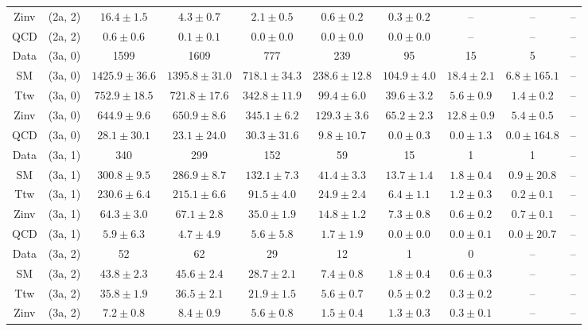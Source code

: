 \begin{table}[h!]
{\begin{tabular}{cccccccccc}
	Zinv & (2a, 2) & $16.4\pm 1.5$ & $4.3\pm 0.7$ & $2.1\pm 0.5$ & $0.6\pm 0.2$ & $0.3\pm 0.2$ & -- & -- & -- \\[0.5ex] 
	QCD & (2a, 2) & $0.6\pm 0.6$ & $0.1\pm 0.1$ & $0.0\pm 0.0$ & $0.0\pm 0.0$ & $0.0\pm 0.0$ & -- & -- & -- \\[0.5ex] 
	Data & (3a, 0) & 1599 & 1609 & 777 & 239 & 95 & 15 & 5 & -- \\[0.5ex] 
	SM & (3a, 0) & $1425.9\pm 36.6$ & $1395.8\pm 31.0$ & $718.1\pm 34.3$ & $238.6\pm 12.8$ & $104.9\pm 4.0$ & $18.4\pm 2.1$ & $6.8\pm 165.1$ & -- \\[0.5ex] 
	Ttw & (3a, 0) & $752.9\pm 18.5$ & $721.8\pm 17.6$ & $342.8\pm 11.9$ & $99.4\pm 6.0$ & $39.6\pm 3.2$ & $5.6\pm 0.9$ & $1.4\pm 0.2$ & -- \\[0.5ex] 
	Zinv & (3a, 0) & $644.9\pm 9.6$ & $650.9\pm 8.6$ & $345.1\pm 6.2$ & $129.3\pm 3.6$ & $65.2\pm 2.3$ & $12.8\pm 0.9$ & $5.4\pm 0.5$ & -- \\[0.5ex] 
	QCD & (3a, 0) & $28.1\pm 30.1$ & $23.1\pm 24.0$ & $30.3\pm 31.6$ & $9.8\pm 10.7$ & $0.0\pm 0.3$ & $0.0\pm 1.3$ & $0.0\pm 164.8$ & -- \\[0.5ex] 
	Data & (3a, 1) & 340 & 299 & 152 & 59 & 15 & 1 & 1 & -- \\[0.5ex] 
	SM & (3a, 1) & $300.8\pm 9.5$ & $286.9\pm 8.7$ & $132.1\pm 7.3$ & $41.4\pm 3.3$ & $13.7\pm 1.4$ & $1.8\pm 0.4$ & $0.9\pm 20.8$ & -- \\[0.5ex] 
	Ttw & (3a, 1) & $230.6\pm 6.4$ & $215.1\pm 6.6$ & $91.5\pm 4.0$ & $24.9\pm 2.4$ & $6.4\pm 1.1$ & $1.2\pm 0.3$ & $0.2\pm 0.1$ & -- \\[0.5ex] 
	Zinv & (3a, 1) & $64.3\pm 3.0$ & $67.1\pm 2.8$ & $35.0\pm 1.9$ & $14.8\pm 1.2$ & $7.3\pm 0.8$ & $0.6\pm 0.2$ & $0.7\pm 0.1$ & -- \\[0.5ex] 
	QCD & (3a, 1) & $5.9\pm 6.3$ & $4.7\pm 4.9$ & $5.6\pm 5.8$ & $1.7\pm 1.9$ & $0.0\pm 0.0$ & $0.0\pm 0.1$ & $0.0\pm 20.7$ & -- \\[0.5ex] 
	Data & (3a, 2) & 52 & 62 & 29 & 12 & 1 & 0 & -- & -- \\[0.5ex] 
	SM & (3a, 2) & $43.8\pm 2.3$ & $45.6\pm 2.4$ & $28.7\pm 2.1$ & $7.4\pm 0.8$ & $1.8\pm 0.4$ & $0.6\pm 0.3$ & -- & -- \\[0.5ex] 
	Ttw & (3a, 2) & $35.8\pm 1.9$ & $36.5\pm 2.1$ & $21.9\pm 1.5$ & $5.6\pm 0.7$ & $0.5\pm 0.2$ & $0.3\pm 0.2$ & -- & -- \\[0.5ex] 
	Zinv & (3a, 2) & $7.2\pm 0.8$ & $8.4\pm 0.9$ & $5.6\pm 0.8$ & $1.5\pm 0.4$ & $1.3\pm 0.3$ & $0.3\pm 0.1$ & -- & -- \\[0.5ex] 

\end{tabular}}
\end{table}

